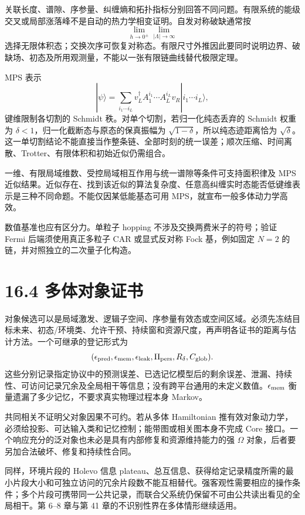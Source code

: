 \documentclass[
  11pt,
  oneside]{book}
\begin{document}
关联长度、谱隙、序参量、纠缠熵和拓扑指标分别回答不同问题。有限系统的能级交叉或局部涨落峰不是自动的热力学相变证明。自发对称破缺通常按
\[
\lim_{h\to0^\pm}\lim_{|\Lambda|\to\infty}
\]
选择无限体积态；交换次序可恢复对称态。有限尺寸外推因此要同时说明边界、破缺场、初态及所用观测量，不能以一张有限链曲线替代极限定理。

MPS 表示 \[
|\psi\rangle=\sum_{i_1\cdots i_L}
 v_L^\dagger A_1^{i_1}\cdots A_L^{i_L}v_R
 |i_1\cdots i_L\rangle,
\] 键维限制各切割的 Schmidt 秩。对单个切割，若归一化纯态丢弃的 Schmidt
权重为 \(\delta<1\)，归一化截断态与原态的保真振幅为
\(\sqrt{1-\delta}\)，所以纯态迹距离恰为
\(\sqrt\delta\)。这一单切割结论不能直接当作整条链、全部时刻的统一误差；顺次压缩、时间离散、Trotter、有限体积和初始近似仍需组合。

一维、有限局域维数、受控局域相互作用与统一谱隙等条件可支持面积律及 MPS
近似结果。近似存在、找到该近似的算法复杂度、任意高纠缠实时态能否低键维表示是三种不同命题。不能仅因某低能基态可用
MPS，就宣布一般多体动力学高效。

数值基准也应有区分力。单粒子 hopping 不涉及交换两费米子的符号；验证
Fermi 后端须使用真正多粒子 CAR 或显式反对称 Fock 基，例如固定 \(N=2\)
的链，并对照独立的二次量子化构造。

\hypertarget{ux591aux4f53ux5bf9ux8c61ux8bc1ux4e66}{%
\section{16.4 多体对象证书}\label{ux591aux4f53ux5bf9ux8c61ux8bc1ux4e66}}

对象候选可以是局域激发、逻辑子空间、序参量有效态或空间区域。必须先冻结目标未来、初态/环境类、允许干预、持续窗和资源尺度，再声明各证书的距离与估计方法。一个可继承的登记形式为
\[
(\epsilon_{\rm pred},\epsilon_{\rm mem},\epsilon_{\rm leak},
\Pi_{\rm pers},R_\delta,C_{\rm glob}).
\]
这些分别记录指定协议中的预测误差、已选记忆模型后的剩余误差、泄漏、持续性、可访问记录冗余及全局相干等信息；没有跨平台通用的未定义数值。\(\epsilon_{\rm mem}\)
衡量遗漏了多少记忆，不要求真实物理过程本身 Markov。

共同相关不证明父对象因果不可约。若从多体 Hamiltonian
推有效对象动力学，必须给投影、可达输入类和记忆控制；能带图或相关图本身不完成
Core 接口。一个响应充分的泛对象也未必是具有内部修复和资源维持能力的强
\(\Omega\) 对象，后者要另加合法破坏、修复和持续性合同。

同样，环境片段的 Holevo 信息
plateau、总互信息、获得给定记录精度所需的最小片段大小和可独立访问的冗余片段数不能互相替代。强客观性需要相应的操作条件；多个片段可携带同一公共记录，而联合父系统仍保留不可由公共读出看见的全局相干。第
6--8 章与第 41 章的不识别性界在多体情形继续适用。
\end{document}
